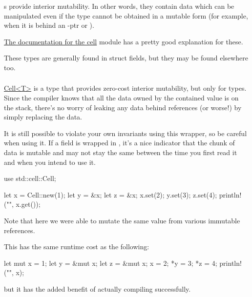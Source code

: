 s provide interior mutability. In other words, they contain data which can be manipulated even if the type 
cannot be obtained in a mutable form (for example, when it is behind an \code{\&}-ptr or ).

\blank

\href{https://doc.rust-lang.org/std/cell/}{The documentation for the cell} module has a pretty good explanation for these.

\blank

These types are generally found in struct fields, but they may be found elsewhere too.

\subsubsection*{}

\href{https://doc.rust-lang.org/std/cell/struct.Cell.html}{Cell<T>} is a type that provides zero-cost interior mutability, 
but only for  types. Since the compiler knows that all the data owned by the contained value is on the stack, 
there's no worry of leaking any data behind references (or worse!) by simply replacing the data.

\blank

It is still possible to violate your own invariants using this wrapper, so be careful when using it. If a field is wrapped 
in , it's a nice indicator that the chunk of data is mutable and may not stay the same between the time you first 
read it and when you intend to use it.

\begin{rustc}
use std::cell::Cell;

let x = Cell::new(1);
let y = &x;
let z = &x;
x.set(2);
y.set(3);
z.set(4);
println!("{}", x.get());
\end{rustc}

Note that here we were able to mutate the same value from various immutable references.

\blank

This has the same runtime cost as the following:

\begin{rustc}
let mut x = 1;
let y = &mut x;
let z = &mut x;
x = 2;
*y = 3;
*z = 4;
println!("{}", x);
\end{rustc}

but it has the added benefit of actually compiling successfully.


